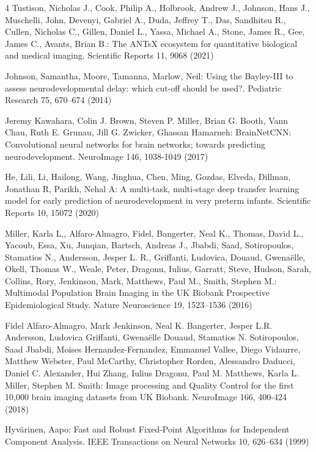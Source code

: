 \documentclass[runningheads,a4paper]{llncs}
\begin{document}
\begin{thebibliography}{4}
 Tustison, Nicholas J., Cook, Philip A., Holbrook, Andrew J., Johnson, Hans J., Muschelli, John, Devenyi, Gabriel A., Duda, Jeffrey T., Das, Sandhitsu R., Cullen, Nicholas C., Gillen, Daniel L., Yassa, Michael A., Stone, James R., Gee, James C., Avants, Brian B.: The {ANTsX} ecosystem for quantitative biological and medical imaging. Scientific Reports 11, 9068 (2021)

 Johnson, Samantha, Moore, Tamanna, Marlow, Neil: Using the Bayley-III to assess neurodevelopmental delay: which cut-off should be used?. Pediatric Research 75, 670--674 (2014)

 Jeremy Kawahara, Colin J. Brown, Steven P. Miller, Brian G. Booth, Vann Chau, Ruth E. Grunau, Jill G. Zwicker, Ghassan Hamarneh: BrainNetCNN: Convolutional neural networks for brain networks; towards predicting neurodevelopment. NeuroImage 146, 1038-1049 (2017)

 He, Lili, Li, Hailong, Wang, Jinghua, Chen, Ming, Gozdas, Elveda, Dillman, Jonathan R, Parikh, Nehal A: A multi-task, multi-stage deep transfer learning model for early prediction of neurodevelopment in very preterm infants. Scientific Reports 10, 15072 (2020)

 Miller, Karla L., Alfaro-Almagro, Fidel, Bangerter, Neal K., Thomas, David L., Yacoub, Essa, Xu, Junqian, Bartsch, Andreas J., Jbabdi, Saad, Sotiropoulos, Stamatios N., Andersson, Jesper L. R., Griffanti, Ludovica, Douaud, Gwena{\"e}lle, Okell, Thomas W., Weale, Peter, Dragonu, Iulius, Garratt, Steve, Hudson, Sarah, Collins, Rory, Jenkinson, Mark, Matthews, Paul M., Smith, Stephen M.: Multimodal Population Brain Imaging in the UK Biobank Prospective Epidemiological Study. Nature Neuroscience 19, 1523--1536 (2016)

 Fidel Alfaro-Almagro, Mark Jenkinson, Neal K. Bangerter, Jesper L.R. Andersson, Ludovica Griffanti, Gwenaëlle Douaud, Stamatios N. Sotiropoulos, Saad Jbabdi, Moises Hernandez-Fernandez, Emmanuel Vallee, Diego Vidaurre, Matthew Webster, Paul McCarthy, Christopher Rorden, Alessandro Daducci, Daniel C. Alexander, Hui Zhang, Iulius Dragonu, Paul M. Matthews, Karla L. Miller, Stephen M. Smith: Image processing and Quality Control for the first 10,000 brain imaging datasets from UK Biobank. NeuroImage 166, 400-424 (2018)

 Hyvärinen, Aapo: Fast and Robust Fixed-Point Algorithms for Independent Component Analysis. IEEE Transactions on Neural Networks 10, 626--634 (1999)


\end{thebibliography}
\end{document}
